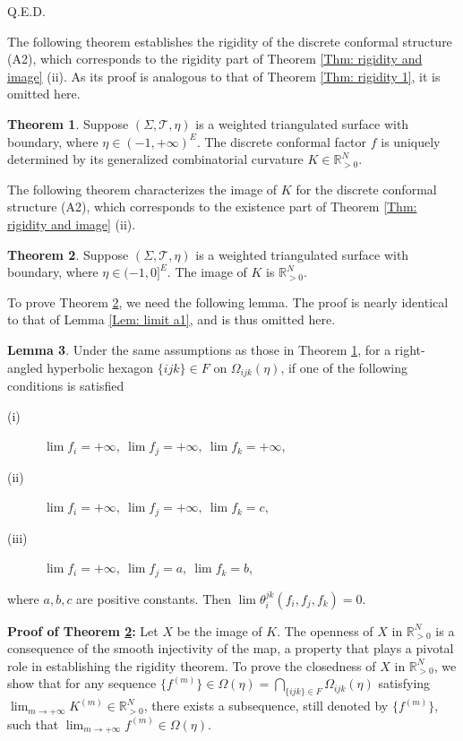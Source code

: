 \documentclass[12pt]{amsart}
\theoremstyle{definition}
\newtheorem{theorem}{Theorem}[section]
\newtheorem{lemma}[theorem]{Lemma}
\def\qed{\hfill{Q.E.D.}\smallskip}
\begin{document}
\qed

The following theorem establishes the rigidity of the discrete conformal structure (A2), 
which corresponds to the rigidity part of Theorem \ref{Thm: rigidity and image} (ii). 
As its proof is analogous to that of Theorem \ref{Thm: rigidity 1}, it is omitted here.

\begin{theorem}\label{Thm: rigidity A2}
Suppose $(\Sigma,\mathcal{T},\eta)$ is a weighted triangulated surface with boundary, where $\eta\in (-1,+\infty)^E$.
The discrete conformal factor $f$ is uniquely determined by its generalized combinatorial curvature $K\in \mathbb{R}^N_{>0}$.
\end{theorem}

The following theorem characterizes the image of $K$ for the discrete conformal structure (A2), 
which corresponds to the existence part of Theorem \ref{Thm: rigidity and image} (ii).

\begin{theorem}\label{Thm: image A2}
Suppose $(\Sigma,\mathcal{T},\eta)$ is a weighted triangulated surface with boundary, where $\eta\in (-1,0]^E$.
The image of $K$ is $\mathbb{R}^N_{>0}$.
\end{theorem}

To prove Theorem \ref{Thm: image A2}, we need the following lemma. 
The proof is nearly identical to that of Lemma \ref{Lem: limit a1}, and is thus omitted here.

\begin{lemma}\label{Lem: limit A2}
Under the same assumptions as those in Theorem \ref{Thm: rigidity A2},
for a right-angled hyperbolic hexagon $\{ijk\}\in F$ on $\Omega_{ijk}(\eta)$,
if one of the following conditions is satisfied
\begin{description}
\item[(i)] $\lim f_i=+\infty,\ \lim f_j=+\infty,\ \lim f_k=+\infty$,
\item[(ii)] $\lim f_i=+\infty,\ \lim f_j=+\infty,\ \lim f_k=c$,
\item[(iii)] $\lim f_i=+\infty,\ \lim f_j=a,\ \lim f_k=b$,
\end{description}
where $a,b,c$ are positive constants.
Then $\lim\theta^{jk}_i(f_i,f_j,f_k)=0$.
\end{lemma}

\noindent\textbf{Proof of Theorem \ref{Thm: image A2}:}
Let $X$ be the image of $K$.
The openness of $X$ in $\mathbb{R}^N_{>0}$ is a consequence of the smooth injectivity of the map, 
a property that plays a pivotal role in establishing the rigidity theorem.
To prove the closedness of $X$ in $\mathbb{R}^N_{>0}$, we show that for any sequence $\{f^{(m)}\}\in\Omega(\eta)=\bigcap_{\{ijk\}\in F}\Omega_{ijk}(\eta)$ satisfying $\lim_{m\rightarrow +\infty}K^{(m)}\in \mathbb{R}^N_{>0}$, 
there exists a subsequence,
still denoted by $\{f^{(m)}\}$, such that $\lim_{m\rightarrow +\infty}f^{(m)}\in\Omega(\eta)$.
\end{document}

